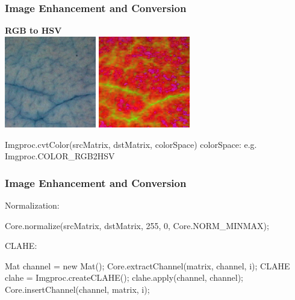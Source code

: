 \documentclass{beamer}
\begin{document}
\begin{frame}[fragile]
	\frametitle{Image Enhancement and Conversion}
	\textbf{RGB to HSV}
	\\
	\vspace{3mm}
	\includegraphics[width = 4cm]{before_3.png}
	\includegraphics[width = 4cm]{after_3.jpg}
	\begin{verbatimtab}
Imgproc.cvtColor(srcMatrix, dstMatrix, colorSpace)
colorSpace: e.g. Imgproc.COLOR_RGB2HSV
	\end{verbatimtab}
\end{frame}

\begin{frame}[fragile]
	\frametitle{Image Enhancement and Conversion}
	Normalization:
	\begin{verbatimtab}
Core.normalize(srcMatrix, dstMatrix, 255, 0,
 Core.NORM_MINMAX);
	\end{verbatimtab}
	
	CLAHE: 
	\begin{verbatimtab}
Mat channel = new Mat();
Core.extractChannel(matrix, channel, i);
CLAHE clahe = Imgproc.createCLAHE();
clahe.apply(channel, channel);
Core.insertChannel(channel, matrix, i);
	\end{verbatimtab}
\end{frame}
\end{document}
